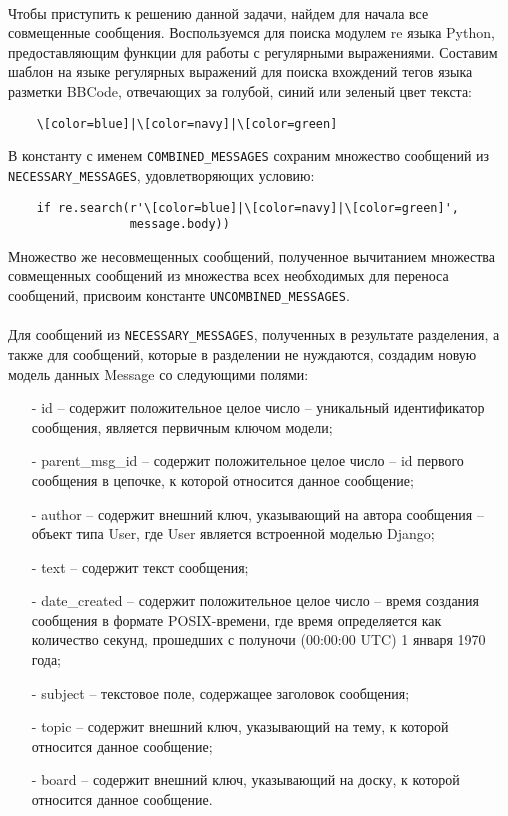 \documentclass[12pt, a4paper, oneside]{article}
\begin{document}
\paragraph{}
Чтобы приступить к решению данной задачи, найдем для начала все совмещенные сообщения. Воспользуемся для поиска модулем re \cite{python-re} языка Python, предоставляющим функции для работы с регулярными выражениями. Составим шаблон на языке регулярных выражений для поиска вхождений тегов языка разметки BBCode, отвечающих за голубой, синий или зеленый цвет текста:
\begin{verbatim}
    \[color=blue]|\[color=navy]|\[color=green]
\end{verbatim}
В константу с именем \texttt{COMBINED\_MESSAGES} сохраним множество сообщений из \texttt{NECESSARY\_MESSAGES}, удовлетворяющих условию:
\begin{verbatim}
    if re.search(r'\[color=blue]|\[color=navy]|\[color=green]', 
                 message.body))
\end{verbatim}
Множество же несовмещенных сообщений, полученное вычитанием множества совмещенных сообщений из множества всех необходимых для переноса сообщений, присвоим константе \texttt{UNCOMBINED\_MESSAGES}.
\paragraph{}
Для сообщений из \texttt{NECESSARY\_MESSAGES}, полученных в результате разделения, а также для сообщений, которые в разделении не нуждаются, создадим новую модель данных Message со следующими полями:
\begin{itemize}
    \item[-] id – содержит положительное целое число – уникальный идентификатор сообщения, является первичным ключом модели;
    \item[-] parent\_msg\_id – содержит положительное целое число – id первого сообщения в цепочке, к которой относится данное сообщение;
    \item[-] author – содержит внешний ключ, указывающий на автора сообщения – объект типа User, где User является встроенной моделью Django;
    \item[-] text – содержит текст сообщения;
    \item[-] date\_created – содержит положительное целое число – время создания сообщения в формате POSIX-времени, где время определяется как количество секунд, прошедших с полуночи (00:00:00 UTC) 1 января 1970 года;
    \item[-] subject – текстовое поле, содержащее заголовок сообщения;
    \item[-] topic – содержит внешний ключ, указывающий на тему, к которой относится данное сообщение;
    \item[-] board – содержит внешний ключ, указывающий на доску, к которой относится данное сообщение.
\end{itemize}
\end{document}
